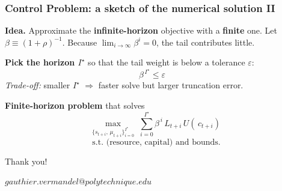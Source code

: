 \documentclass[xcolor=x11names,compress,aspectratio=169]{beamer}%
\makeatletter
\renewenvironment{itemize}{\begin{compactitemize}[<+-| alert@+>]}{\end{compactitemize}}
\makeatother
\begin{document}
\begin{frame}%
%

\frametitle{Control Problem: a sketch of the numerical solution II}%


\begin{itemize}
\item \textbf{Idea.} Approximate the \textbf{infinite-horizon} objective with
a \textbf{finite} one. Let $\beta\equiv(1+\rho)^{-1}$. Because $\lim
_{i\rightarrow\infty}\beta^{i}=0$, the tail contributes little.

\item \textbf{Pick the horizon $I^{\star}$ }so that the tail weight is below a
tolerance $\varepsilon$:
\[
\beta^{\,I^{\star}}\leq\varepsilon\quad
\]
\emph{Trade-off:} smaller $I^{\star}$ $\Rightarrow$ faster solve but larger
truncation error.

\item \textbf{Finite-horizon problem }that solves
\[
\max_{\{s_{t+i},\,\mu_{t+i}\}_{i=0}^{I^{\star}}}\;\sum_{i=0}^{I^{\star}}%
\beta^{\,i}\,L_{t+i}\,U\left(  \,c_{t+i}\right)  \;
\]%
\[
\text{s.t. (resource, capital) and bounds.}%
\]

\end{itemize}

%

\transboxout
\end{frame}%
%

\begin{frame}%


\begin{center}
Thank you!

\vspace{5ex}

$gauthier.vermandel@polytechnique.edu$
\end{center}

%

\transboxout
\end{frame}%
%


%
\end{document}
